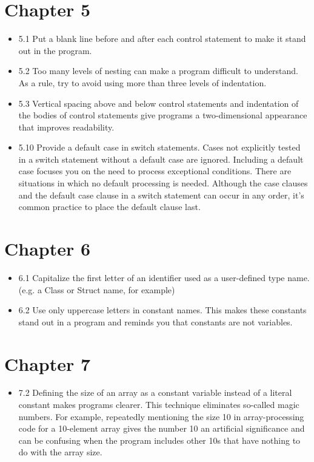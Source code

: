 \documentclass[11pt]{article}
\begin{document}
\section{Chapter 5}
\label{sec-5}
\begin{itemize}
\item 5.1 Put a blank line before and after each control statement to make
it stand out in the program.
\item 5.2 Too many levels of nesting can make a program difficult to
understand. As a rule, try to avoid using more than three levels of
indentation.
\item 5.3 Vertical spacing above and below control statements and
indentation of the bodies of control statements give programs a
two-dimensional appearance that improves readability.
\item 5.10 Provide a default case in switch statements. Cases not
explicitly tested in a switch statement without a default case are
ignored. Including a default case focuses you on the need to process
exceptional conditions. There are situations in which no default
processing is needed. Although the case clauses and the default case
clause in a switch statement can occur in any order, it’s common
practice to place the default clause last.
\end{itemize}
\section{Chapter 6}
\label{sec-6}
\begin{itemize}
\item 6.1 Capitalize the first letter of an identifier used as a
user-defined type name. (e.g. a Class or Struct name, for example)
\item 6.2 Use only uppercase letters in constant names. This makes these
constants stand out in a program and reminds you that constants are
not variables.
\end{itemize}
\section{Chapter 7}
\label{sec-7}
\begin{itemize}
\item 7.2 Defining the size of an array as a constant variable instead of
a literal constant makes programs clearer. This technique eliminates
so-called magic numbers. For example, repeatedly mentioning the size
10 in array-processing code for a 10-element array gives the number
10 an artificial significance and can be confusing when the program
includes other 10s that have nothing to do with the array size.
\end{itemize}
\end{document}
